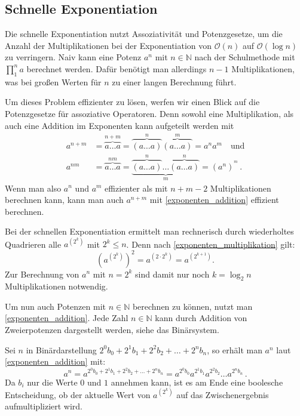 \documentclass[course=erap]{aspdoc}
\begin{document}
\subsection{Schnelle Exponentiation} \label{sec:schnelle_exp}
Die schnelle Exponentiation nutzt Assoziativität und Potenzgesetze, um die Anzahl der Multiplikationen bei der Exponentiation von $\mathcal{O}(n)$ auf $\mathcal{O}(\log{}n)$ zu verringern. 
Naiv kann eine Potenz $a^n$ mit $n\in\mathbb{N}$ nach der Schulmethode mit \(\prod_{1}^{n} a \) berechnet werden. 
Dafür benötigt man allerdings $n-1$ Multiplikationen, was bei großen Werten für $n$ zu einer langen Berechnung führt. \par
Um dieses Problem effizienter zu lösen, werfen wir einen Blick auf die Potenzgesetze für assoziative Operatoren. Denn sowohl eine Multiplikation, als auch eine Addition im Exponenten kann aufgeteilt werden mit
\begin{align}
  a^{n+m} &= \overbrace{a\dots a}^{n+m} = \overbrace{(a\dots a)}^n \overbrace{(a\dots a)}^m = a^n a^m \quad \text{und} \label{exponenten_addition} \\
  a^{nm} &= \overbrace{a\dots a}^{nm} = \underbrace{\overbrace{(a \dots a)}^n \dots \overbrace{(a \dots a)}^n}_m = (a^n)^{^m} \, . \label{exponenten_multiplikation}
\end{align}
Wenn man also $a^n$ und $a^m$ effizienter als mit $n+m-2$ Multiplikationen berechnen kann, kann man auch $a^{n+m}$ mit \ref{exponenten_addition} effizient berechnen.\par
Bei der schnellen Exponentiation ermittelt man rechnerisch durch wiederholtes Quadrieren alle $a^{(2^k)}$ mit $2^k \le n$. Denn nach \ref{exponenten_multiplikation} gilt:
\[ {\left( a^{(2^k)} \right)}^2 = a^{(2 \cdot 2^k)} = a^{(2^{k+1})}.\]
Zur Berechnung von $a^n$ mit $n=2^k$ sind damit nur noch $k=\log_2n$ Multiplikationen notwendig. \par
Um nun auch Potenzen mit $n\in\mathbb{N}$ berechnen zu können, nutzt man \ref{exponenten_addition}. 
Jede Zahl $n\in\mathbb{N}$ kann durch Addition von Zweierpotenzen dargestellt werden, siehe das Binärsystem. \par
Sei $n$ in Binärdarstellung $2^0b_0+2^1b_1+2^2b_2+\dots+2^nb_n$, so erhält man $a^n$ laut \ref{exponenten_addition} mit:
\[ a^n = a^{2^0b_0+2^1b_1+2^2b_2+\dots+2^nb_n} = a^{2^0b_0} a^{2^1b_1} a^{2^2b_2} \dots a^{2^nb_n} \, .\]
Da $b_i$ nur die Werte $0$ und $1$ annehmen kann, ist es am Ende eine boolesche Entscheidung, ob der aktuelle Wert von $a^{(2^k)}$ auf das Zwischenergebnis aufmultipliziert wird.\\
\end{document}
